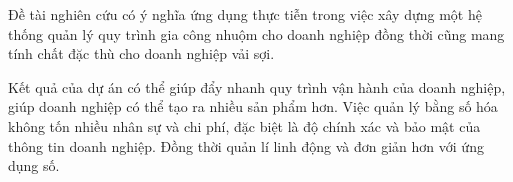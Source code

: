 Đề tài nghiên cứu có ý nghĩa ứng dụng thực tiễn trong việc xây dựng một hệ thống quản lý quy trình gia công nhuộm cho doanh nghiệp đồng thời cũng mang tính chất đặc thù cho doanh nghiệp vải sợi. \par

Kết quả của dự án có thể giúp đẩy nhanh quy trình vận hành của doanh nghiệp, giúp doanh nghiệp có thể tạo ra nhiều sản phẩm hơn. Việc quản lý bằng số hóa không tốn nhiều nhân sự và chi phí, đặc biệt là độ chính xác và bảo mật của thông tin doanh nghiệp. Đồng thời quản lí linh động và đơn giản hơn với ứng dụng số.